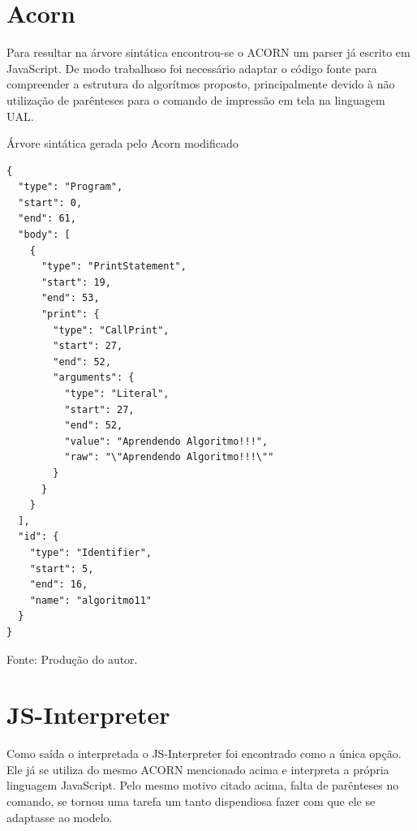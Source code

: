 \section{Acorn}

Para resultar na árvore sintática encontrou-se o ACORN\nocite{acorn} um parser já escrito em JavaScript. De modo trabalhoso foi necessário adaptar o código fonte para compreender a estrutura do algorítmos proposto, principalmente devido à não utilização de parênteses para o comando de impressão em tela na linguagem UAL.

\begin{quadro}[h]
\centering
  \caption{Árvore sintática gerada pelo Acorn modificado}\label{qua:compare-tools}
\begin{lstlisting}[style=json,frame=single]
{
  "type": "Program",
  "start": 0,
  "end": 61,
  "body": [
    {
      "type": "PrintStatement",
      "start": 19,
      "end": 53,
      "print": {
        "type": "CallPrint",
        "start": 27,
        "end": 52,
        "arguments": {
          "type": "Literal",
          "start": 27,
          "end": 52,
          "value": "Aprendendo Algoritmo!!!",
          "raw": "\"Aprendendo Algoritmo!!!\""
        }
      }
    }
  ],
  "id": {
    "type": "Identifier",
    "start": 5,
    "end": 16,
    "name": "algoritmo11"
  }
}
\end{lstlisting}
  \caption*{\ifdraft{\color{green}}{}\footnotesize Fonte: Produção do autor.}
\end{quadro}

\section{JS-Interpreter}

Como saída o interpretada o JS-Interpreter\nocite{jsinterpreter} foi encontrado como a única opção. Ele já se utiliza do mesmo ACORN mencionado acima e interpreta a própria linguagem JavaScript. Pelo mesmo motivo citado acima, falta de parênteses no comando, se tornou uma tarefa um tanto dispendiosa fazer com que ele se adaptasse ao modelo.


